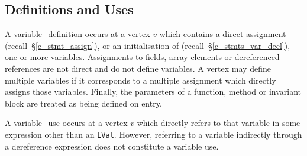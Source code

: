 \subsection{Definitions and Uses}

A \gls{variable_definition} occurs at a vertex $v$ which contains a direct assignment (recall~\S\ref{c_stmt_assign}), or an initialisation of (recall~\S\ref{c_stmts_var_decl}), one or more variables.  Assignments to fields, array elements or dereferenced references are not direct and do not define variables.  A vertex may define multiple variables if it corresponds to a multiple assignment which directly assigns those variables.  Finally, the parameters of a function, method or invariant block are treated as being defined on entry. 

A \gls{variable_use} occurs at a vertex $v$ which directly refers to that variable in some expression other than an \lstinline{LVal}.  However, referring to a variable indirectly through a dereference expression does not constitute a variable use.
